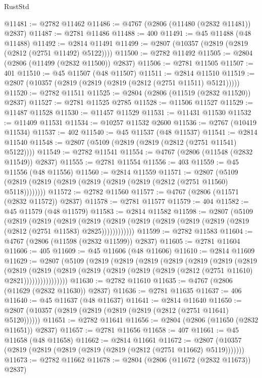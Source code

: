 \begin{lexlean}{RustStd}
\begin{coremodule}
@11481 := @2782 @11462
@11486 := @4767 (@2806 (@11480 (@2832 @11481)) @2837)
@11487 := @2781 @11486
@11488 := 400
@11491 := @45 @11488 (@48 @11488)
@11492 := @2814 @11491
@11499 := @2807 (@10357 (@2819 (@2819 (@2812 (@2751 @11492) @5122))))
@11500 := @2782 @11492
@11505 := @2804 (@2806 (@11499 (@2832 @11500)) @2837)
@11506 := @2781 @11505
@11507 := 401
@11510 := @45 @11507 (@48 @11507)
@11511 := @2814 @11510
@11519 := @2807 (@10357 (@2819 (@2819 (@2819 (@2812 (@2751 @11511) @5121)))))
@11520 := @2782 @11511
@11525 := @2804 (@2806 (@11519 (@2832 @11520)) @2837)
@11527 := @2781 @11525 @2785
@11528 := @11506 @11527
@11529 := @11487 @11528
@11530 := @11457 @11529
@11531 := @11431 @11530
@11532 := @11409 @11531
@11534 := @10257 @11532 @2600
@11536 := @2767 (@10419 @11534)
@11537 := 402
@11540 := @45 @11537 (@48 @11537)
@11541 := @2814 @11540
@11548 := @2807 (@5109 (@2819 (@2819 (@2812 (@2751 @11541) @5122))))
@11549 := @2782 @11541
@11554 := @4767 (@2806 (@11548 (@2832 @11549)) @2837)
@11555 := @2781 @11554
@11556 := 403
@11559 := @45 @11556 (@48 @11556)
@11560 := @2814 @11559
@11571 := @2807 (@5109 (@2819 (@2819 (@2819 (@2819 (@2819 (@2819 (@2812 (@2751 @11560) @5118))))))))
@11572 := @2782 @11560
@11577 := @4767 (@2806 (@11571 (@2832 @11572)) @2837)
@11578 := @2781 @11577
@11579 := 404
@11582 := @45 @11579 (@48 @11579)
@11583 := @2814 @11582
@11598 := @2807
    (@5109
      (@2819
        (@2819
          (@2819
            (@2819 (@2819 (@2819 (@2819 (@2819 (@2819 (@2819 (@2812 (@2751 @11583) @2825))))))))))))
@11599 := @2782 @11583
@11604 := @4767 (@2806 (@11598 (@2832 @11599)) @2837)
@11605 := @2781 @11604
@11606 := 405
@11609 := @45 @11606 (@48 @11606)
@11610 := @2814 @11609
@11629 := @2807
    (@5109
      (@2819
        (@2819
          (@2819
            (@2819
              (@2819
                (@2819
                  (@2819
                    (@2819
                      (@2819
                        (@2819
                          (@2819 (@2819 (@2819 (@2819 (@2812 (@2751 @11610) @2821))))))))))))))))
@11630 := @2782 @11610
@11635 := @4767 (@2806 (@11629 (@2832 @11630)) @2837)
@11636 := @2781 @11635
@11637 := 406
@11640 := @45 @11637 (@48 @11637)
@11641 := @2814 @11640
@11650 := @2807 (@10357 (@2819 (@2819 (@2819 (@2819 (@2812 (@2751 @11641) @5120))))))
@11651 := @2782 @11641
@11656 := @2804 (@2806 (@11650 (@2832 @11651)) @2837)
@11657 := @2781 @11656
@11658 := 407
@11661 := @45 @11658 (@48 @11658)
@11662 := @2814 @11661
@11672 := @2807 (@10357 (@2819 (@2819 (@2819 (@2819 (@2819 (@2812 (@2751 @11662) @5119)))))))
@11673 := @2782 @11662
@11678 := @2804 (@2806 (@11672 (@2832 @11673)) @2837)

\end{coremodule}
\end{lexlean}
